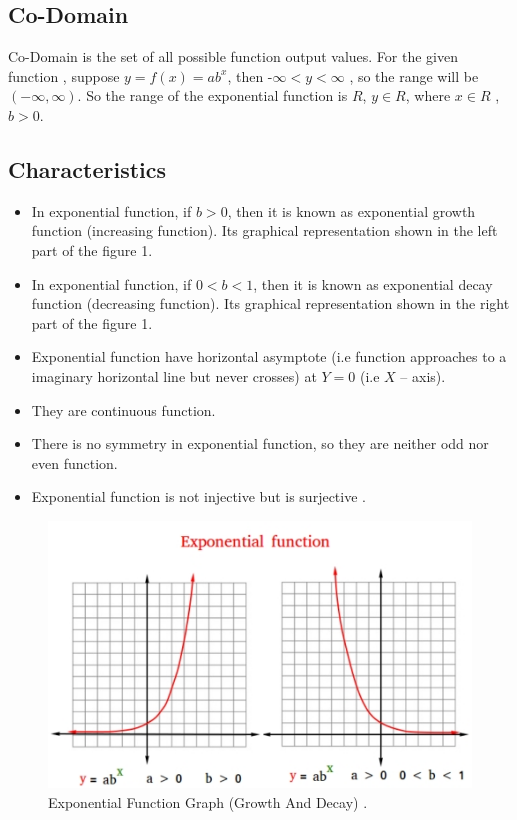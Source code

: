 \documentclass[12pt, a4paper]{article}
\begin{document}
\subsection{Co-Domain}

Co-Domain is the set of all possible function output values.
\newline For the given function , suppose $y = f(x) = ab^x $, then -$ \infty < y <\infty $ , so the range will be $ (-\infty,\infty) $. So the range of the exponential function is $R$, $ y \in R $, where $ x \in R $ , $ b > 0 $.

\subsection{Characteristics}
\begin{itemize}
	\item In exponential function, if $ b > 0 $, then it is known as exponential growth function (increasing function). Its graphical representation shown in the left part of the figure 1.
	\item In exponential function, if $ 0 < b < 1$, then it is known as exponential decay function (decreasing function). Its graphical representation shown in the right part of the figure 1.
	\item Exponential function have horizontal asymptote (i.e function approaches to a imaginary horizontal line but never crosses) at $ Y=0 $ (i.e $ X $ – axis).
	\item They are continuous function.
	\item There is no symmetry in exponential function, so they are neither odd nor even function.
	\item Exponential function is not injective but is surjective \cite{Injectivity and Surjectivity of Exponential Function}.
\end{itemize}

\newpage

\begin{figure}[h]
	\includegraphics[width=\linewidth]{exponential-function.jpg}
	\caption{Exponential Function Graph (Growth And Decay) \cite{Exponential Function Graph}.}
	\label{fig:exponential function graph (growth and decay)}
\end{figure}
\end{document}
